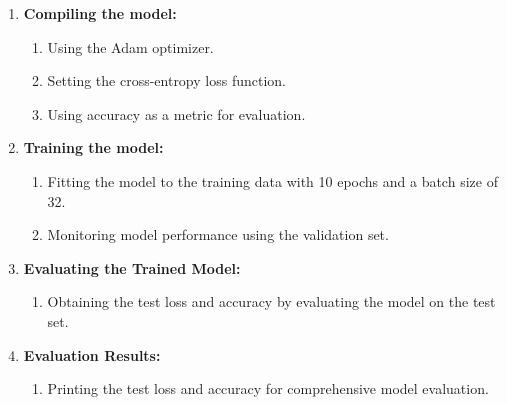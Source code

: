 \begin{enumerate}
   \item \textbf{Compiling the model:}
         \begin{enumerate}
            \item Using the Adam optimizer.
            \item Setting the cross-entropy loss function.
            \item Using accuracy as a metric for evaluation.
         \end{enumerate}

   \item \textbf{Training the model:}
         \begin{enumerate}
            \item Fitting the model to the training data with 10 epochs and a batch size of 32.
            \item Monitoring model performance using the validation set.
         \end{enumerate}

   \item \textbf{Evaluating the Trained Model:}
         \begin{enumerate}
            \item Obtaining the test loss and accuracy by evaluating the model on the test set.
         \end{enumerate}

   \item \textbf{Evaluation Results:}
         \begin{enumerate}
            \item Printing the test loss and accuracy for comprehensive model evaluation.
         \end{enumerate}
\end{enumerate}




